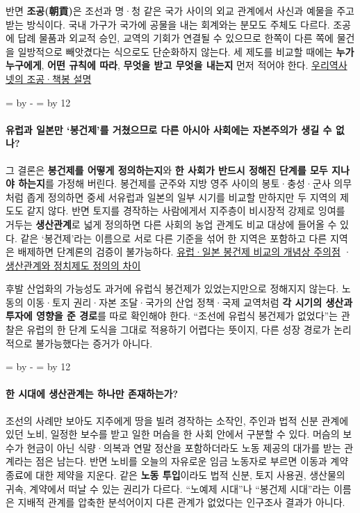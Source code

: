 \documentclass[10pt,a4paper]{article}
\newcommand{\ReserveQuestionSpace}{%
  \par\begingroup
  \dimen0=\pagegoal \advance\dimen0 by -\pagetotal
  \dimen2=\baselineskip \multiply\dimen2 by 12
  \ifdim\dimen0<\dimen2 \newpage\fi
  \endgroup}
\begin{document}
반면 \textbf{조공(朝貢)}은 조선과 명·청 같은 국가 사이의 외교 관계에서 사신과 예물을 주고받는 방식이다. 국내 가구가 국가에 공물을 내는 회계와는 분모도 주체도 다르다. 조공에 답례 물품과 외교적 승인, 교역의 기회가 연결될 수 있으므로 한쪽이 다른 쪽에 물건을 일방적으로 빼앗겼다는 식으로도 단순화하지 않는다. 세 제도를 비교할 때에는 \textbf{누가 누구에게}, \textbf{어떤 규칙에 따라}, \textbf{무엇을 받고 무엇을 내는지} 먼저 적어야 한다. \href{https://contents.history.go.kr/front/tg/view.do?levelId=tg\_003\_1420}{우리역사넷의 조공·책봉 설명}\par

\ReserveQuestionSpace
\paragraph{유럽과 일본만 ‘봉건제’를 거쳤으므로 다른 아시아 사회에는 자본주의가 생길 수 없나?}
그 결론은 \textbf{봉건제를 어떻게 정의하는지}와 \textbf{한 사회가 반드시 정해진 단계를 모두 지나야 하는지}를 가정해 버린다. 봉건제를 군주와 지방 영주 사이의 봉토·충성·군사 의무처럼 좁게 정의하면 중세 서유럽과 일본의 일부 시기를 비교할 만하지만 두 지역의 제도도 같지 않다. 반면 토지를 경작하는 사람에게서 지주층이 비시장적 강제로 잉여를 거두는 \textbf{생산관계}로 넓게 정의하면 다른 사회의 농업 관계도 비교 대상에 들어올 수 있다. 같은 ‘봉건제’라는 이름으로 서로 다른 기준을 섞어 한 지역은 포함하고 다른 지역은 배제하면 단계론의 검증이 불가능하다. \href{https://www.asianstudies.org/wp-content/uploads/using-the-concept-feudalism-to-compare-japan-with-europe-words-of-caution.pdf}{유럽·일본 봉건제 비교의 개념상 주의점} · \href{https://journals.sagepub.com/doi/10.1177/009770048000600402}{생산관계와 정치제도 정의의 차이}\par

후발 산업화의 가능성도 과거에 유럽식 봉건제가 있었는지만으로 정해지지 않는다. 노동의 이동·토지 권리·자본 조달·국가의 산업 정책·국제 교역처럼 \textbf{각 시기의 생산과 투자에 영향을 준 경로}를 따로 확인해야 한다. “조선에 유럽식 봉건제가 없었다”는 관찰은 유럽의 한 단계 도식을 그대로 적용하기 어렵다는 뜻이지, 다른 성장 경로가 논리적으로 불가능했다는 증거가 아니다.\par

\ReserveQuestionSpace
\paragraph{한 시대에 생산관계는 하나만 존재하는가?}

조선의 사례만 보아도 지주에게 땅을 빌려 경작하는 소작인, 주인과 법적 신분 관계에 있던 노비, 일정한 보수를 받고 일한 머슴을 한 사회 안에서 구분할 수 있다. 머슴의 보수가 현금이 아닌 식량·의복과 연말 정산을 포함하더라도 노동 제공의 대가를 받는 관계라는 점은 남는다. 반면 노비를 오늘의 자유로운 임금 노동자로 부르면 이동과 계약 종료에 대한 제약을 지운다. 같은 \textbf{노동 투입}이라도 법적 신분, 토지 사용권, 생산물의 귀속, 계약에서 떠날 수 있는 권리가 다르다. “노예제 시대”나 “봉건제 시대”라는 이름은 지배적 관계를 압축한 분석어이지 다른 관계가 없었다는 인구조사 결과가 아니다.\par
\end{document}
